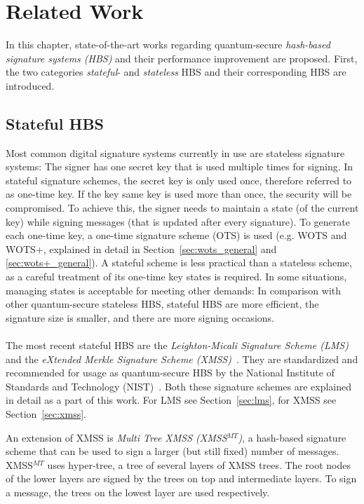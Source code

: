 \chapter{Related Work}
\label{cha:stateOfTheArt}

In this chapter, state-of-the-art works regarding quantum-secure \textit{hash-based signature systems (HBS)} and their performance improvement are proposed. 
First, the two categories \textit{stateful}- and \textit{stateless} HBS and their corresponding HBS are introduced. %

\section{Stateful HBS} %
Most common digital signature systems currently in use are stateless signature systems: The signer has one secret key that is used multiple times for signing. In stateful signature schemes, the secret key is only used once, therefore referred to as one-time key. If the key same key is used more than once, the security will be compromised. 
To achieve this, the signer needs to maintain a state (of the current key) while signing messages (that is updated after every signature). To generate each one-time key, a one-time signature scheme (OTS) is used (e.g. WOTS and WOTS+, explained in detail in Section~\ref{sec:wots_general} and \ref{sec:wots+_general}).
A stateful scheme is less practical than a stateless scheme, as a careful treatment of its one-time key states is required. 
In some situations, managing states is acceptable for meeting other demands: In comparison with other quantum-secure stateless HBS, stateful HBS are more efficient, the signature size is smaller, and there are more signing occasions.~\cite{properties_stateless_HBS_2022}
\\ \\
The most recent stateful HBS are the \textit{Leighton-Micali Signature Scheme (LMS)}~\cite{LMS_RFC8554} and the \textit{eXtended Merkle Signature Scheme (XMSS)}~\cite{xmss_RFC8391}. They are standardized and recommended for usage as quantum-secure HBS by the National Institute of Standards and Technology (NIST)~\cite{stateful_hashbased_sign_schemes_NIST_2020}. Both these signature schemes are explained in detail as a part of this work. For LMS see Section~\ref{sec:lms}, for XMSS see Section~\ref{sec:xmss}.

An extension of XMSS is \textit{Multi Tree XMSS (XMSS$^{MT}$)}, a hash-based
signature scheme that can be used to sign a larger (but still fixed) number of messages.
XMSS$^{MT}$ uses hyper-tree, a tree of several layers of XMSS trees. The root nodes of the lower layers are signed by the trees on top and intermediate layers. To sign a message, the trees on the lowest layer are used respectively.~\cite{xmss_multitree_2013,xmss_RFC8391}

